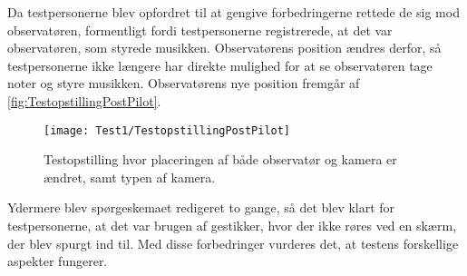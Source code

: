 Da testpersonerne blev opfordret til at gengive forbedringerne rettede de sig mod observatøren, formentligt fordi testpersonerne registrerede, at det var observatøren, som styrede musikken. Observatørens position ændres derfor, så testpersonerne ikke længere har direkte mulighed for at se observatøren tage noter og styre musikken. Observatørens nye position fremgår af \autoref{fig:TestopstillingPostPilot}. 
%
\begin{figure}[H]
	\centering
	\texttt{[image: Test1/TestopstillingPostPilot]}
	\caption{Testopstilling hvor placeringen af både observatør og kamera er ændret, samt typen af kamera.}
	\label{fig:TestopstillingPostPilot}
\end{figure}
\noindent
% 
Ydermere blev spørgeskemaet redigeret to gange, så det blev klart for testpersonerne, at det var brugen af gestikker, hvor der ikke røres ved en skærm, der blev spurgt ind til. \blankline
%
Med disse forbedringer vurderes det, at testens forskellige aspekter fungerer.  
 

